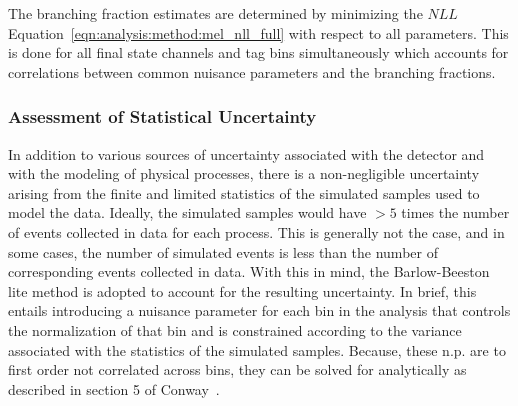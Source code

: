 

The branching fraction estimates are determined by minimizing the $NLL$ Equation~\ref{eqn:analysis:method:mel_nll_full} with respect to all parameters.  This is done for all final state channels and \PQb tag bins simultaneously which accounts for correlations between common nuisance parameters and the \PW branching fractions.

\subsubsection{Assessment of Statistical Uncertainty}
In addition to various sources of uncertainty associated with the detector and with the modeling of physical processes, there is a non-negligible uncertainty arising from the finite and limited statistics of the simulated samples used to model the data.  Ideally, the simulated samples would have $>5$ times the number of events collected in data for each process.  This is generally not the case, and in some cases, the number of simulated events is less than the number of corresponding events collected in data.  With this in mind, the Barlow-Beeston lite method is adopted to account for the resulting uncertainty.  In brief, this entails introducing a nuisance parameter for each bin in the analysis that controls the normalization of that bin and is constrained according to the variance associated with the statistics of the simulated samples.  Because, these n.p. are to first order not correlated across bins, they can be solved for analytically as described in section 5 of Conway~\cite{Conway:2011in}.

